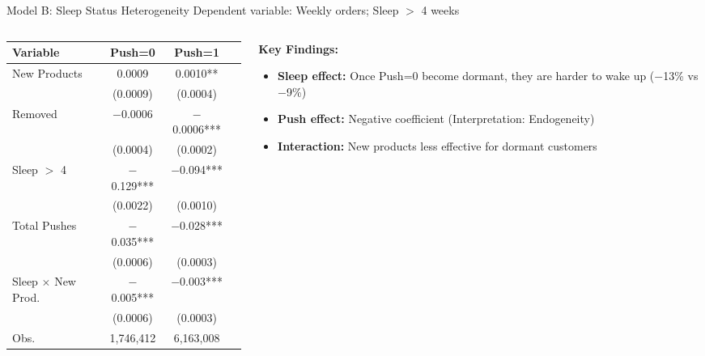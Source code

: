 \documentclass[aspectratio=169]{beamer}  %
\begin{document}
\begin{frame}{Model B: Sleep Status Heterogeneity}
Dependent variable: Weekly orders; Sleep $>$ 4 weeks
\vspace{0.2cm}

\begin{columns}
\begin{column}{0.55\linewidth}
\begin{table}
\centering
\scriptsize
\begin{tabular}{lccc}
\toprule
\textbf{Variable} & \textbf{Push=0} & \textbf{Push=1} \\
\midrule
New Products & 0.0009 & 0.0010** \\
 & (0.0009) & (0.0004) \\
Removed & $-$0.0006 & $-$0.0006*** \\
 & (0.0004) & (0.0002) \\
Sleep $>$ 4 & $-$0.129*** & $-$0.094*** \\
 & (0.0022) & (0.0010) \\
Total Pushes & $-$0.035*** & $-$0.028*** \\
 & (0.0006) & (0.0003) \\
Sleep $\times$ New Prod. & $-$0.005*** & $-$0.003*** \\
 & (0.0006) & (0.0003) \\
\midrule
Obs. & 1,746,412 & 6,163,008 \\
\bottomrule
\end{tabular}
\end{table}
\end{column}
\begin{column}{0.45\linewidth}
\textbf{Key Findings:}
\begin{itemize}
    \item \textbf{Sleep effect:} Once Push=0 become dormant, they are harder to wake up ($-$13\% vs $-$9\%)
    \item \textbf{Push effect:} Negative coefficient (Interpretation: Endogeneity)
    \item \textbf{Interaction:} New products less effective for dormant customers
\end{itemize}
\end{column}
\end{columns}
\end{frame}
\end{document}
